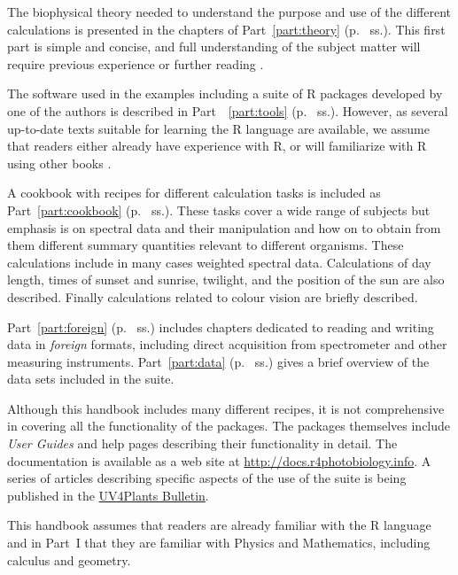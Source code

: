 The biophysical theory needed to understand the purpose and use of the different calculations is presented in the chapters of Part~\ref{part:theory} (p.~\pageref{part:theory} ss.). This first part is simple and concise, and full understanding of the subject matter will require previous experience or further reading \autocite[e.g.][]{Aphalo2012,Bjoern2015}.

The software used in the examples including a suite of R packages developed by one of the authors is described in Part~~\ref{part:tools} (p.~\pageref{part:tools} ss.). However, as several up-to-date texts suitable for learning the R language are available, we assume that readers either already have experience with R, or will familiarize with R using other books \autocite[e.g.][]{Aphalo2016,Horton2015a,Paradis2005,Peng2016}.

A cookbook with recipes for different calculation tasks is included as Part~\ref{part:cookbook} (p.~\pageref{part:cookbook} ss.). These tasks cover a wide range of subjects but emphasis is on spectral data and their manipulation and how on to obtain from them different summary quantities relevant to different organisms. These calculations include in many cases weighted spectral data. Calculations of day length, times of sunset and sunrise, twilight, and the position of the sun are also described. Finally calculations related to colour vision are briefly described.

Part~\ref{part:foreign} (p.~\pageref{part:foreign} ss.) includes chapters dedicated to reading and writing data in \emph{foreign} formats, including direct acquisition from spectrometer and other measuring instruments. Part~\ref{part:data} (p.~\pageref{part:data} ss.) gives a brief overview of the data sets included in the suite.

Although this handbook includes many different recipes, it is not comprehensive in covering all the functionality of the packages. The packages themselves include \emph{User Guides} and help pages describing their functionality in detail. The documentation is available as a web site at \url{http://docs.r4photobiology.info}. A series of articles describing specific aspects of the use of the suite is being published in the \href{http://uv4plants.org/publications/uv4plants-bulletin-published-issues/}{UV4Plants Bulletin}.

This handbook assumes that readers are already familiar with the R language and in Part~I that they are familiar with Physics and Mathematics, including calculus and geometry.

